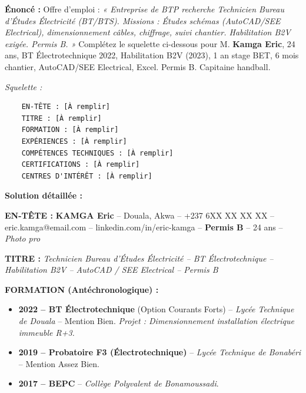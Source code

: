 \documentclass[11pt]{article}
\begin{document}
\begin{exoresolu}
    \textbf{Énoncé :} Offre d'emploi : \emph{« Entreprise de BTP recherche Technicien Bureau d'Études Électricité (BT/BTS). Missions : Études schémas (AutoCAD/SEE Electrical), dimensionnement câbles, chiffrage, suivi chantier. Habilitation B2V exigée. Permis B. »}
    Complétez le squelette ci-dessous pour M. \textbf{Kamga Eric}, 24 ans, BT Électrotechnique 2022, Habilitation B2V (2023), 1 an stage BET, 6 mois chantier, AutoCAD/SEE Electrical, Excel. Permis B. Capitaine handball.

    \textit{Squelette :}
    \begin{verbatim}
    EN-TÊTE : [À remplir]
    TITRE : [À remplir]
    FORMATION : [À remplir]
    EXPÉRIENCES : [À remplir]
    COMPÉTENCES TECHNIQUES : [À remplir]
    CERTIFICATIONS : [À remplir]
    CENTRES D'INTÉRÊT : [À remplir]
    \end{verbatim}

    \tcblower
    \textbf{Solution détaillée :}

    \textbf{EN-TÊTE :}
    \textbf{KAMGA Eric} -- Douala, Akwa -- +237 6XX XX XX XX -- eric.kamga@email.com -- linkedin.com/in/eric-kamga -- \textbf{Permis B} -- 24 ans -- \textit{Photo pro}

    \textbf{TITRE :}
    \textit{Technicien Bureau d'Études Électricité -- BT Électrotechnique -- Habilitation B2V -- AutoCAD / SEE Electrical -- Permis B}

    \textbf{FORMATION (Antéchronologique) :}
    \begin{itemize}
        \item \textbf{2022 -- BT Électrotechnique} (Option Courants Forts) -- \textit{Lycée Technique de Douala} -- Mention Bien. \textit{Projet : Dimensionnement installation électrique immeuble R+3.}
        \item \textbf{2019 -- Probatoire F3 (Électrotechnique)} -- \textit{Lycée Technique de Bonabéri} -- Mention Assez Bien.
        \item \textbf{2017 -- BEPC} -- \textit{Collège Polyvalent de Bonamoussadi}.
    \end{itemize}


\end{exoresolu}
\end{document}
